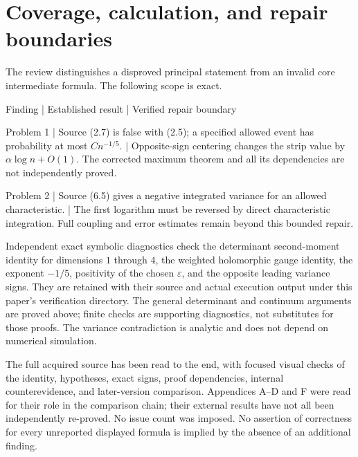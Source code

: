 \documentclass[10pt]{article}
\begin{document}
\section*{Coverage, calculation, and repair boundaries}
The review distinguishes a disproved principal statement from an invalid core intermediate formula. The following scope is exact.\par
Finding | Established result | Verified repair boundary\par
Problem 1 | Source (2.7) is false with (2.5); a specified allowed event has probability at most \(C n^{-1/5}\). | Opposite-sign centering changes the strip value by \(\alpha\log n+O(1)\). The corrected maximum theorem and all its dependencies are not independently proved.\par
Problem 2 | Source (6.5) gives a negative integrated variance for an allowed characteristic. | The first logarithm must be reversed by direct characteristic integration. Full coupling and error estimates remain beyond this bounded repair.\par
Independent exact symbolic diagnostics check the determinant second-moment identity for dimensions \(1\) through \(4\), the weighted holomorphic gauge identity, the exponent \(-1/5\), positivity of the chosen \(\varepsilon\), and the opposite leading variance signs. They are retained with their source and actual execution output under this paper’s verification directory. The general determinant and continuum arguments are proved above; finite checks are supporting diagnostics, not substitutes for those proofs. The variance contradiction is analytic and does not depend on numerical simulation.\par
The full acquired source has been read to the end, with focused visual checks of the identity, hypotheses, exact signs, proof dependencies, internal counterevidence, and later-version comparison. Appendices A–D and F were read for their role in the comparison chain; their external results have not all been independently re-proved. No issue count was imposed. No assertion of correctness for every unreported displayed formula is implied by the absence of an additional finding.\par
\end{document}
